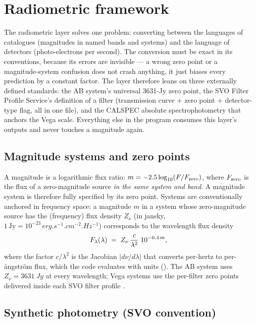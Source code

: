 \section{Radiometric framework}
\label{sec:radiometry}

The radiometric layer solves one problem: converting between the
languages of catalogues (magnitudes in named bands and systems) and the
language of detectors (photo-electrons per second). The conversion must
be exact in its conventions, because its errors are invisible ---
a wrong zero point or a magnitude-system confusion does not crash
anything, it just biases every prediction by a constant factor. The
layer therefore leans on three externally defined standards: the AB
system's universal 3631-Jy zero point, the SVO Filter Profile Service's
definition of a filter (transmission curve + zero point + detector-type
flag, all in one file), and the CALSPEC absolute spectrophotometry that
anchors the Vega scale. Everything else in the program consumes this
layer's outputs and never touches a magnitude again.

\subsection{Magnitude systems and zero points}

A magnitude is a logarithmic flux ratio: $m = -2.5\log_{10}(F/F_{\rm
zero})$, where $F_{\rm zero}$ is the flux of a zero-magnitude source
\emph{in the same system and band}. A magnitude system is therefore fully
specified by its zero point. Systems are conventionally anchored in
frequency space: a magnitude $m$ in a system whose zero-magnitude source
has the (frequency) flux density $Z_\nu$ (in jansky,
$1\,\mathrm{Jy}=10^{-23}\,\si{erg.s^{-1}.cm^{-2}.Hz^{-1}}$) corresponds to
the wavelength flux density
\begin{equation}
  F_\lambda(\lambda) \;=\; Z_\nu \, \frac{c}{\lambda^2}\; 10^{-0.4\,m},
  \label{eq:flam}
\end{equation}
where the factor $c/\lambda^2$ is the Jacobian $|d\nu/d\lambda|$ that
converts per-hertz to per-\aa ngstr\"om flux,
which the code evaluates with  units
(). The AB system \citep{oke1983} uses
$Z_\nu = \SI{3631}{Jy}$ at every wavelength; Vega systems use the per-filter
zero points delivered inside each SVO filter profile
\citep{rodrigo2020,bessell1998}.

\subsection{Synthetic photometry (SVO convention)}

